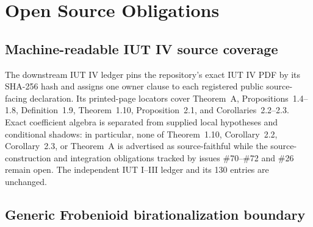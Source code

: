 \chapter{Open Source Obligations}
\label{ch:source-obligations}

\section{Machine-readable IUT IV source coverage}

\begin{definition}
  \label{def:iut-iv-source-ledger}
  \leanok
  The downstream IUT IV ledger pins the repository's exact IUT IV PDF by its
  SHA-256 hash and
  assigns one owner clause to each registered public source-facing declaration.
  Its printed-page locators cover Theorem~A, Propositions~1.4--1.8,
  Definition~1.9, Theorem~1.10, Proposition~2.1, and
  Corollaries~2.2--2.3.  Exact coefficient algebra is separated from supplied
  local hypotheses and conditional shadows: in particular, none of
  Theorem~1.10, Corollary~2.2, Corollary~2.3, or Theorem~A is advertised as
  source-faithful while the source-construction and integration obligations
  tracked by issues \#70--\#72 and \#26 remain open.  The independent IUT
  I--III ledger and its 130 entries are unchanged.
\end{definition}

\section{Generic Frobenioid birationalization boundary}

